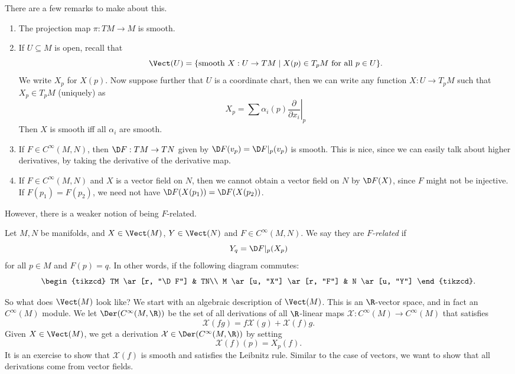 \documentclass[a4paper]{article}
\begin{document}
There are a few remarks to make about this.
\begin{enumerate}
  \item The projection map $\pi: TM \to M$ is smooth.
  \item If $U \subseteq M$ is open, recall that
    \[
      \Vect(U) = \{\text{smooth }X: U \to TM\mid X(p) \in T_pM\text{ for all }p \in U\}.
    \]
    We write $X_p$ for $X(p)$. Now suppose further that $U$ is a coordinate chart, then we can write any function $X: U \to T_p M$ such that $X_p \in T_p M$ (uniquely) as
    \[
      X_p = \sum \alpha_i(p) \left.\frac{\partial}{\partial x_i} \right|_p
    \]
    Then $X$ is smooth iff all $\alpha_i$ are smooth.
  \item If $F \in C^\infty(M, N)$, then $\D F: TM \to TN$ given by $\D F(v_p) = \D F|_p(v_p)$ is smooth. This is nice, since we can easily talk about higher derivatives, by taking the derivative of the derivative map.
  \item If $F \in C^\infty (M, N)$ and $X$ is a vector field on $N$, then we cannot obtain a vector field on $N$ by $\D F(X)$, since $F$ might not be injective. If $F(p_1) = F(p_2)$, we need not have $\D F(X(p_1)) = \D F(X(p_2))$.
\end{enumerate}
However, there is a weaker notion of being $F$-related.
\begin{defi}[$F$-related]
  Let $M, N$ be manifolds, and $X \in \Vect(M)$, $Y \in \Vect(N)$ and $F \in C^\infty(M, N)$. We say they are \emph{$F$-related} if
  \[
    Y_q = \D F|_p (X_p)
  \]
  for all $p \in M$ and $F(p) = q$. In other words, if the following diagram commutes:
  \[
    \begin{tikzcd}
      TM \ar[r, "\D F"] & TN\\
      M \ar[u, "X"] \ar[r, "F"] & N \ar[u, "Y"]
    \end{tikzcd}.
  \]
\end{defi}

So what does $\Vect(M)$ look like? We start with an algebraic description of $\Vect(M)$. This is an $\R$-vector space, and in fact an $C^\infty(M)$ module. We let $\Der(C^\infty(M, \R))$ be the set of all derivations of all $\R$-linear maps $\mathcal{X}: C^\infty(M) \to C^\infty(M)$ that satisfies
\[
  \mathcal{X}(fg) = f \mathcal{X}(g) + \mathcal{X}(f) g.
\]
Given $X \in \Vect(M)$, we get a derivation $\mathcal{X} \in \Der(C^\infty(M, \R))$ by setting
\[
  \mathcal{X}(f)(p) = X_p(f).
\]
It is an exercise to show that $\mathcal{X}(f)$ is smooth and satisfies the Leibnitz rule. Similar to the case of vectors, we want to show that all derivations come from vector fields.
\end{document}
